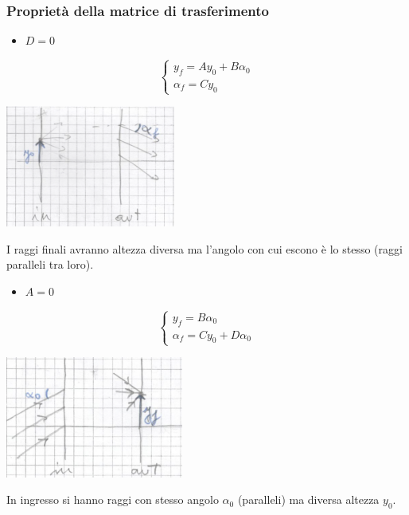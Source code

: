 \documentclass{article}
\theoremstyle{remark}
\begin{document}
\subsubsection*{Proprietà della matrice di trasferimento}
\begin{itemize}
\item $D = 0$
\end{itemize}
\begin{minipage}{.5\textwidth}
\[
\begin{cases}
y_f = Ay_0 + B\alpha_0\\
\alpha_f = Cy_0
\end{cases}
\]
\end{minipage}
\begin{minipage}{.5\textwidth}
	\centering
    \includegraphics[height=4cm]{images/d_nullo}
\end{minipage}
I raggi finali avranno altezza diversa ma l'angolo con cui escono è lo stesso (raggi paralleli tra loro).
\begin{itemize}
\item $A = 0$
\end{itemize}
\begin{minipage}{.5\textwidth}
\[
\begin{cases}
y_f = B\alpha_0\\
\alpha_f = Cy_0 + D\alpha_0
\end{cases}
\]
\end{minipage}
\begin{minipage}{.5\textwidth}
	\centering
    \includegraphics[height=4cm]{images/a_nullo}
\end{minipage}
In ingresso si hanno raggi con stesso angolo $\alpha_0$ (paralleli) ma diversa altezza $y_0$.\\
\end{document}
